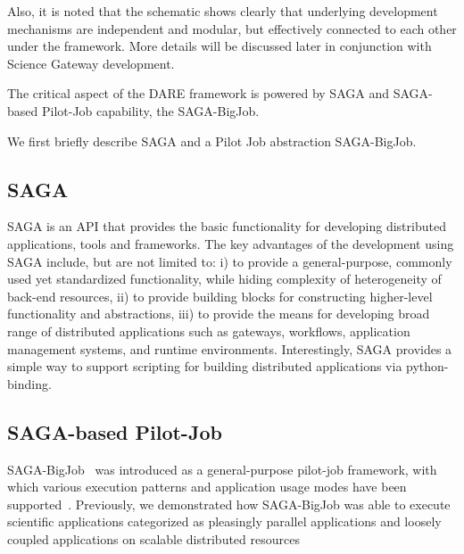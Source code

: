 \documentclass[]{article}
\begin{document}
Also, it is noted that the schematic shows clearly that underlying development mechanisms are independent and modular, but effectively connected to each other under the framework.  More details will be discussed later in conjunction with Science Gateway development. 

The critical aspect of the DARE framework is powered by SAGA and
SAGA-based Pilot-Job capability, the SAGA-BigJob\cite{saga-ccgrid10}. 
%


We first briefly describe SAGA and a Pilot Job abstraction SAGA-BigJob. 
 


\subsection{SAGA}
SAGA is an API that provides the basic functionality for developing
distributed applications, tools and frameworks\cite{saga_url}. The key
advantages of the development using SAGA include, but are not limited
to: i) to provide a general-purpose, commonly used yet standardized
functionality, while hiding complexity of heterogeneity of back-end
resources, ii) to provide building blocks for constructing
higher-level functionality and abstractions, iii) to provide the means
for developing broad range of distributed applications such as
gateways, workflows, application management systems, and runtime
environments.  Interestingly, SAGA provides a simple way to support
scripting for building distributed applications via python-binding.


\subsection{SAGA-based Pilot-Job}

SAGA-BigJob~\cite{saga-ccgrid10} was introduced as a general-purpose
pilot-job framework, with which various execution patterns and
application usage modes have been
supported~\cite{async_repex11,saga-royalsoc}.  Previously, we
demonstrated how SAGA-BigJob was able to execute scientific
applications categorized as pleasingly parallel applications and
loosely coupled applications on scalable distributed
resources\cite{jha2009developing, ecmls10, ecmls11}
\end{document}
